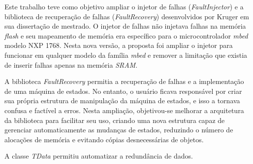 Este trabalho teve como objetivo ampliar o injetor de falhas (\textit{FaultInjector}) e a biblioteca de recuperação de falhas (\textit{FaultRecovery}) desenvolvidos por Kruger \cite{Kruger:2014} em sua dissertação de mestrado. O injetor de falhas não injetava falhas na memória \textit{flash} e seu mapeamento de memória era específico para o microcontrolador \textit{mbed} modelo NXP 1768. Nesta nova versão, a proposta foi ampliar o injetor para funcionar em qualquer modelo da família \textit{mbed} e remover a limitação que existia de inserir falhas apenas na memória \textit{SRAM}.

A biblioteca \textit{FaultRecovery} permitia a recuperação de falhas e a implementação de uma máquina de estados. No entanto, o usuário ficava responsável por criar sua própria estrutura de manipulação da máquina de estados, e isso a tornava confusa e factível a erros. Nesta ampliação, objetivou-se melhorar a arquitetura da biblioteca para facilitar seu uso, criando uma nova estrutura capaz de gerenciar automaticamente as mudanças de estados, reduzindo o número de alocações de memória e evitando cópias desnecessárias de objetos.

A classe \textit{TData} permitiu automatizar a redundância de dados.



